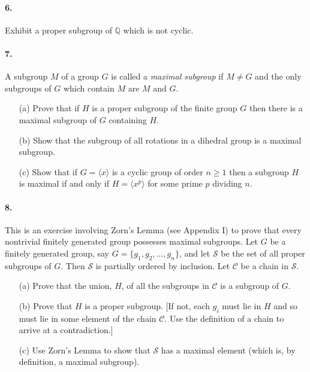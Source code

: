 \paragraph{6.} Exhibit a proper subgroup of $\mathbb{Q}$ which is not cyclic.

\paragraph{7.} A subgroup $M$ of a group $G$ is called a \textit{maximal subgroup} if $M \neq G$ and the only subgroups of $G$ which contain $M$ are $M$ and $G$.
\begin{enumerate}
    \item[(a)] Prove that if $H$ is a proper subgroup of the finite group $G$ then there is a maximal subgroup of $G$ containing $H$.
    \item[(b)] Show that the subgroup of all rotations in a dihedral group is a maximal subgroup.
    \item[(c)] Show that if $G = \langle x \rangle$ is a cyclic group of order $n \ge 1$ then a subgroup $H$ is maximal if and only if $H = \langle x^p \rangle$ for some prime $p$ dividing $n$.
\end{enumerate}

\paragraph{8.} This is an exercise involving Zorn's Lemma (see Appendix I) to prove that every nontrivial finitely generated group possesses maximal subgroups. Let $G$ be a finitely generated group, say $G = \{g_1, g_2, \dots, g_n\}$, and let $\mathcal{S}$ be the set of all proper subgroups of $G$. Then $\mathcal{S}$ is partially ordered by inclusion. Let $\mathcal{C}$ be a chain in $\mathcal{S}$.
\begin{enumerate}
    \item[(a)] Prove that the union, $H$, of all the subgroups in $\mathcal{C}$ is a subgroup of $G$.
    \item[(b)] Prove that $H$ is a proper subgroup. [If not, each $g_i$ must lie in $H$ and so must lie in some element of the chain $\mathcal{C}$. Use the definition of a chain to arrive at a contradiction.]
    \item[(c)] Use Zorn's Lemma to show that $\mathcal{S}$ has a maximal element (which is, by definition, a maximal subgroup).
\end{enumerate}

